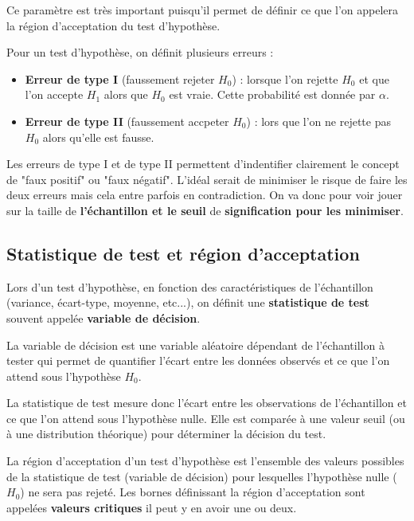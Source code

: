 Ce paramètre est très important puisqu'il permet de définir ce que l'on appelera la région d'acceptation du test 
d'hypothèse. 

\begin{definition}[Erreurs]
    Pour un test d'hypothèse, on définit plusieurs erreurs :
    \begin{itemize}
        \item \textbf{Erreur de type I} (faussement rejeter $H_0$) : lorsque l'on rejette $H_0$ et que l'on accepte 
        $H_1$ alors que $H_0$ est vraie. Cette probabilité est donnée par $\alpha$. 
        \item \textbf{Erreur de type II} (faussement accpeter $H_0$) : lors que l'on ne rejette pas $H_0$ alors 
        qu'elle est fausse. 
    \end{itemize}
\end{definition}

Les erreurs de type I et de type II permettent d'indentifier clairement le concept de "faux positif" ou "faux négatif". 
L'idéal serait de minimiser le risque de faire les deux erreurs mais cela entre parfois en contradiction. On va donc pour voir 
jouer sur la taille de \textbf{l'échantillon et le seuil} de \textbf{signification pour les minimiser}. 


\subsection{Statistique de test et région d'acceptation}

Lors d'un test d'hypothèse, en fonction des caractéristiques de l'échantillon (variance, écart-type, moyenne, etc...),
on définit une \textbf{statistique de test} souvent appelée \textbf{variable de décision}. 

\begin{definition}
    La variable de décision est une variable aléatoire dépendant de l'échantillon à tester qui 
    permet de quantifier l'écart entre les données observés et ce que l'on attend sous l'hypothèse $H_0$.  
\end{definition}

La statistique de test mesure donc l'écart entre les observations de l'échantillon et ce que l'on attend sous l'hypothèse nulle. 
Elle est comparée à une valeur seuil (ou à une distribution théorique) pour déterminer la décision du test.

\begin{definition}
    La région d'acceptation d'un test d'hypothèse est l'ensemble des valeurs possibles de la statistique de test 
    (variable de décision) pour lesquelles l'hypothèse nulle ($H_0$) ne sera pas rejeté. 
    Les bornes définissant la région d'acceptation sont appelées \textbf{valeurs critiques} il peut y en avoir une ou deux. 
\end{definition}

